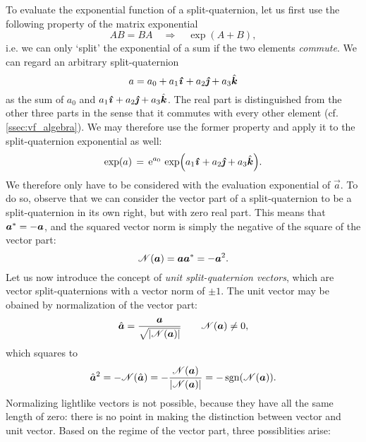 To evaluate the exponential function of a split-quaternion, let us first use the following property of the matrix exponential \cite{Hall2013}
$$ AB = BA \quad \Rightarrow \quad \exp(A + B), $$
i.e. we can only `split' the exponential of a sum if the two elements \emph{commute}. We can regard an arbitrary split-quaternion
$$ a = \quat{a_0}{a_1}{a_2}{a_3} $$
as the sum of $a_0$ and $\quatvec{a_1}{a_2}{a_3}$. The real part is distinguished from the other three parts in the sense that it commutes
with every other element (cf. \cref{ssec:vf_algebra}). We may therefore use the former property and apply it to the split-quaternion exponential as well:
$$ \exp(a) \, = \,\ec^{a_0}\,\exp(\quatvec{a_1}{a_2}{a_3}). $$
We therefore only have to be considered with the evaluation exponential of $\vec{a}$. To do so, observe that we can consider the vector part of a split-quaternion to be a split-quaternion in its own right, but with zero real part. This means that $ \conj{\vec{a}} = -\vec{a} $, and the squared vector norm is simply the negative of the square of the vector part:
$$ \mathscr{N}(\vec{a}) = \vec{a} \conj{\vec{a}} = -\vec{a}^2. $$
Let us now introduce the concept of \emph{unit split-quaternion vectors}, which are vector split-quaternions with a vector norm of $\pm 1$. The unit vector may be obained by normalization of the vector part:
$$ \hat{\vec{a}} = \frac{\vec{a}}{\sqrt{\abs{\mathscr{N}(\vec{a})}}} \qquad \mathscr{N}(\vec{a}) \neq 0, $$
which squares to
$$ \hat{\vec{a}}^2 = - \mathscr{N}(\hat{\vec{a}}) 
                   = - \frac{\mathscr{N}(\vec{a})}{\abs{\mathscr{N}(\vec{a})}} 
                   = - \sgn(\mathscr{N}(\vec{a})).
$$
Normalizing lightlike vectors is not possible, because they have all the same length of zero: there is no point in making the distinction between vector and unit vector. Based on the regime of the vector part, three possiblities arise: \cite{Motter1998,Harkin2004}
